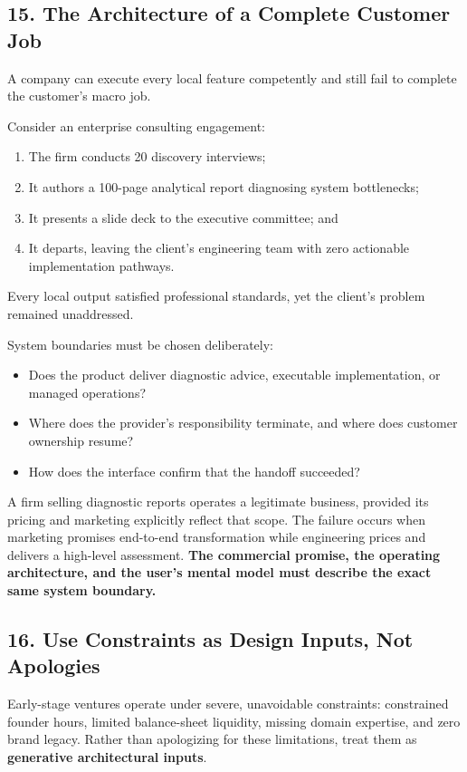 \subsection*{15. The Architecture of a Complete Customer Job}

A company can execute every local feature competently and still fail to complete the customer's macro job.

Consider an enterprise consulting engagement:
\begin{enumerate}
    \item The firm conducts 20 discovery interviews;
    \item It authors a 100-page analytical report diagnosing system bottlenecks;
    \item It presents a slide deck to the executive committee; and
    \item It departs, leaving the client's engineering team with zero actionable implementation pathways.
\end{enumerate}

Every local output satisfied professional standards, yet the client's problem remained unaddressed.

System boundaries must be chosen deliberately:
\begin{itemize}
    \item Does the product deliver diagnostic advice, executable implementation, or managed operations?
    \item Where does the provider's responsibility terminate, and where does customer ownership resume?
    \item How does the interface confirm that the handoff succeeded?
\end{itemize}

A firm selling diagnostic reports operates a legitimate business, provided its pricing and marketing explicitly reflect that scope. The failure occurs when marketing promises end-to-end transformation while engineering prices and delivers a high-level assessment. \textbf{The commercial promise, the operating architecture, and the user's mental model must describe the exact same system boundary.}

\subsection*{16. Use Constraints as Design Inputs, Not Apologies}

Early-stage ventures operate under severe, unavoidable constraints: constrained founder hours, limited balance-sheet liquidity, missing domain expertise, and zero brand legacy. Rather than apologizing for these limitations, treat them as \textbf{generative architectural inputs}.

